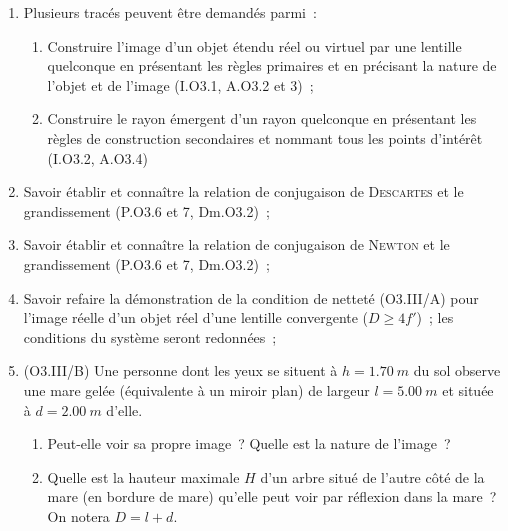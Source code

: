 \documentclass[a4paper, 12pt, final, garamond]{book}
\begin{document}
\begin{enumerate}[label=\sqenumi]
	\item Plusieurs tracés peuvent être demandés parmi~:
	      \begin{enumerate}
		      \item Construire l'image d'un objet étendu réel ou virtuel par une
		            lentille quelconque en présentant les règles primaires et en
		            précisant la nature de l'objet et de l'image (I.O3.1, A.O3.2 et
		            3)~;
		      \item Construire le rayon émergent d'un rayon quelconque en présentant
		            les règles de construction secondaires et nommant tous les points
		            d'intérêt (I.O3.2, A.O3.4)
	      \end{enumerate}

	\item Savoir établir et connaître la relation de conjugaison de
	      \textsc{Descartes} et le grandissement (P.O3.6 et 7, Dm.O3.2)~;

	\item Savoir établir et connaître la relation de conjugaison de
	      \textsc{Newton} et le grandissement (P.O3.6 et 7, Dm.O3.2)~;

	\item Savoir refaire la démonstration de la condition de netteté (O3.III/A)
	      pour l'image réelle d'un objet réel d'une lentille convergente ($D \geq
		      4f'$)~; les conditions du système seront redonnées~;

	\item \leavevmode%
	      (O3.III/B) Une personne dont les yeux se situent à $h = \SI{1.70}{m}$ du
	      sol observe une mare gelée (équivalente à un miroir plan) de largeur $l
		      = \SI{5.00}{m}$ et située à $d = \SI{2.00}{m}$ d'elle.
	      \begin{enumerate}
		      \item Peut-elle voir sa propre image~? Quelle est la nature de
		            l'image~?
		      \item Quelle est la hauteur maximale $H$ d'un arbre situé de l'autre
		            côté de la mare (en bordure de mare) qu'elle peut voir par
		            réflexion dans la mare~? On notera $D = l+d$.
	      \end{enumerate}
\end{enumerate}
\end{document}
